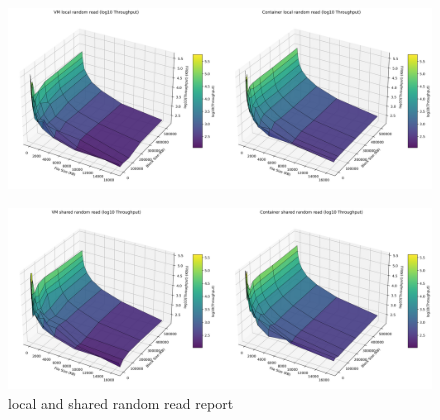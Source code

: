 \begin{figure}[H]
    \centering
    \includegraphics[width=\linewidth]{assets/VM local random read_Container local random read_log_surfaces.png}
        \end{figure}
\begin{figure}[H]
    \centering
    \includegraphics[width=\linewidth]{assets/VM shared random read_Container shared random read_log_surfaces.png}
    \caption{local and shared random read report}
    \label{fig:enter-label}
\end{figure}

